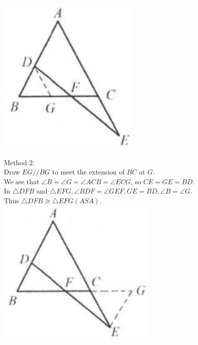 \documentclass{article}
\begin{document}
\includegraphics[width=\textwidth]{images/102(2).jpg}

Method 2:\\
Draw \(E G / / B G\) to meet the extension of \(B C\) at \(G\).\\
We see that \(\angle B=\angle G=\angle A C B=\angle E C G\), so \(C E=G E=B D\).\\
In \(\triangle D F B\) and \(\triangle E F G, \angle B D F=\angle G E F, G E=B D, \angle B=\angle G\).\\
Thus \(\triangle D F B \cong \triangle E F G(A S A)\).\\
\centering
\includegraphics[width=\textwidth]{images/102(3).jpg}
\end{document}
